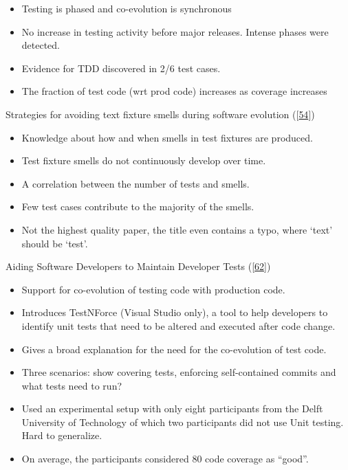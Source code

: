 \documentclass[]{book}
\providecommand{\tightlist}{%
  \setlength{\itemsep}{0pt}\setlength{\parskip}{0pt}}
\begin{document}
\begin{itemize}
\tightlist
\item
  Testing is phased and co-evolution is synchronous
\item
  No increase in testing activity before major releases. Intense phases
  were detected.
\item
  Evidence for TDD discovered in 2/6 test cases.
\item
  The fraction of test code (wrt prod code) increases as coverage
  increases
\end{itemize}

Strategies for avoiding text fixture smells during software evolution
({[}\protect\hyperlink{ref-greiler2013}{54}{]})

\begin{itemize}
\tightlist
\item
  Knowledge about how and when smells in test fixtures are produced.
\item
  Test fixture smells do not continuously develop over time.
\item
  A correlation between the number of tests and smells.
\item
  Few test cases contribute to the majority of the smells.
\item
  Not the highest quality paper, the title even contains a typo, where
  `text' should be `test'.
\end{itemize}

Aiding Software Developers to Maintain Developer Tests
({[}\protect\hyperlink{ref-hurdugaci2012}{62}{]})

\begin{itemize}
\tightlist
\item
  Support for co-evolution of testing code with production code.
\item
  Introduces TestNForce (Visual Studio only), a tool to help developers
  to identify unit tests that need to be altered and executed after code
  change.
\item
  Gives a broad explanation for the need for the co-evolution of test
  code.
\item
  Three scenarios: show covering tests, enforcing self-contained commits
  and what tests need to run?
\item
  Used an experimental setup with only eight participants from the Delft
  University of Technology of which two participants did not use Unit
  testing. Hard to generalize.
\item
  On average, the participants considered 80 code coverage as ``good''.
\end{itemize}
\end{document}

